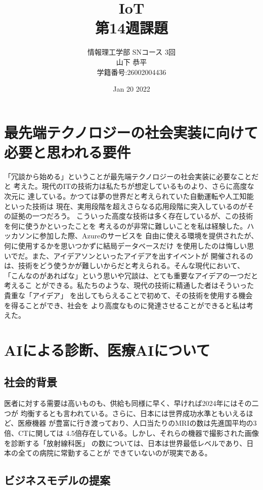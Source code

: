 \documentclass[dvipdfmx,autodetect-engine,titlepage]{jsarticle}
\title{IoT\\
第14週課題}
\author{情報理工学部 SNコース 3回\\
山下 恭平\\
学籍番号:26002004436}
\date{Jan 20 2022}
\begin{document}
\maketitle

\section{最先端テクノロジーの社会実装に向けて必要と思われる要件}

「冗談から始める」ということが最先端テクノロジーの社会実装に必要なことだと
考えた。現代のITの技術力は私たちが想定しているものより、さらに高度な次元に
達している。かつては夢の世界だと考えられていた自動運転や人工知能といった技術は
現在、実用段階を超えさらなる応用段階に突入しているのがその証拠の一つだろう。
こういった高度な技術は多く存在しているが、この技術を何に使うかといったことを
考えるのが非常に難しいことを私は経験した。ハッカソンに参加した際、Azureのサービスを
自由に使える環境を提供されたが、何に使用するかを思いつかずに結局データベースだけ
を使用したのは悔しい思いでだ。また、アイデアソンといったアイデアを出すイベントが
開催されるのは、技術をどう使うかが難しいからだと考えられる。そんな現代において、
「こんなのがあればな」という思いや冗談は、とても重要なアイデアの一つだと考えるこ
とができる。私たちのような、現代の技術に精通した者はそういった貴重な「アイデア」
を出してもらえることで初めて、その技術を使用する機会を得ることができ、社会を
より高度なものに発達させることができると私は考えた。

\section{AIによる診断、医療AIについて}

\subsection*{社会的背景}
医者に対する需要は高いものも、供給も同様に早く、早ければ2024年にはその二つが
均衡するとも言われている。さらに、日本には世界成功水準ともいえるほど、医療機器
が豊富に行き渡っており、人口当たりのMRIの数は先進国平均の3倍、CTに関しては
4.5倍存在している。しかし、それらの機器で撮影された画像を診断する「放射線科医」
の数については、日本は世界最低レベルであり、日本の全ての病院に常勤することが
できていないのが現実である。

\subsection*{ビジネスモデルの提案}
\end{document}
